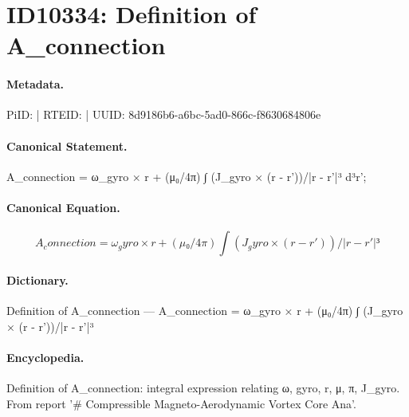 \section*{ID10334: Definition of A\_connection}
\paragraph{Metadata.}
PiID:  | RTEID:  | UUID: 8d9186b6-a6bc-5ad0-866c-f8630684806e

\paragraph{Canonical Statement.}
A\_connection = ω\_gyro × r + (μ₀/4π) ∫ (J\_gyro × (r - r'))/|r - r'|³ d³r';

\paragraph{Canonical Equation.}
\[
A_connection = ω_gyro × r + (μ₀/4π) ∫ (J_gyro × (r - r'))/|r - r'|³
\]

\paragraph{Dictionary.}
Definition of A\_connection — A\_connection = ω\_gyro × r + (μ₀/4π) ∫ (J\_gyro × (r - r'))/|r - r'|³

\paragraph{Encyclopedia.}
Definition of A\_connection: integral expression relating ω, gyro, r, μ, π, J\_gyro. From report '\# Compressible Magneto-Aerodynamic Vortex Core Ana'.
